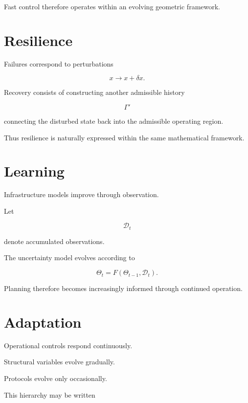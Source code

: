 \documentclass[11pt,fleqn]{book}
\numberwithin{equation}{chapter}
\theoremstyle{plain}
\theoremstyle{definition}
\theoremstyle{remark}
\begin{document}

Fast control therefore operates within an evolving geometric framework.


\section{Resilience}

Failures correspond to perturbations

\[
x
\rightarrow
x+\delta x.
\]

Recovery consists of constructing another admissible history

\[
\Gamma'
\]

connecting the disturbed state back into the admissible operating
region.

Thus resilience is naturally expressed within the same mathematical
framework.


\section{Learning}

Infrastructure models improve through observation.

Let

\[
\mathcal D_t
\]

denote accumulated observations.

The uncertainty model evolves according to

\[
\Theta_t
=
F(\Theta_{t-1},\mathcal D_t).
\]

Planning therefore becomes increasingly informed through continued
operation.


\section{Adaptation}

Operational controls respond continuously.

Structural variables evolve gradually.

Protocols evolve only occasionally.

This hierarchy may be written
\end{document}
